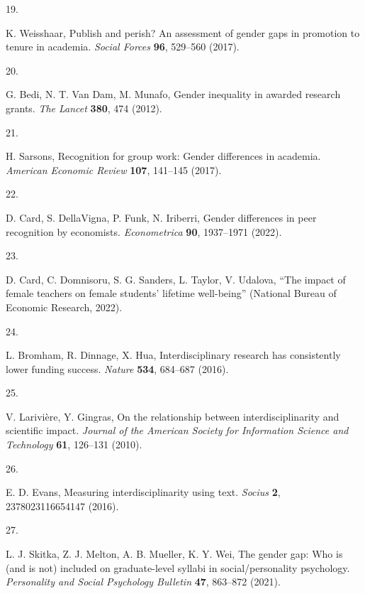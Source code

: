 \documentclass[
  12pt,
]{article}
\newlength{\cslhangindent}
\newlength{\csllabelwidth}
\newenvironment{CSLReferences}[2] %
 {\begin{list}{}{%
  \setlength{\itemindent}{0pt}
  \setlength{\leftmargin}{0pt}
  \setlength{\parsep}{0pt}
  \ifodd #1
   \setlength{\leftmargin}{\cslhangindent}
   \setlength{\itemindent}{-1\cslhangindent}
  \fi
  \setlength{\itemsep}{#2\baselineskip}}}
 {\end{list}}
\newcommand{\CSLLeftMargin}[1]{\parbox[t]{\csllabelwidth}{\strut#1\strut}}
\newcommand{\CSLRightInline}[1]{\parbox[t]{\linewidth - \csllabelwidth}{\strut#1\strut}}
\begin{document}
\begin{CSLReferences}{0}{1}
\CSLLeftMargin{19. }%
\CSLRightInline{K. Weisshaar, Publish and perish? An assessment of gender gaps in promotion to tenure in academia. \emph{Social Forces} \textbf{96}, 529--560 (2017).}

\CSLLeftMargin{20. }%
\CSLRightInline{G. Bedi, N. T. Van Dam, M. Munafo, Gender inequality in awarded research grants. \emph{The Lancet} \textbf{380}, 474 (2012).}

\CSLLeftMargin{21. }%
\CSLRightInline{H. Sarsons, Recognition for group work: Gender differences in academia. \emph{American Economic Review} \textbf{107}, 141--145 (2017).}

\CSLLeftMargin{22. }%
\CSLRightInline{D. Card, S. DellaVigna, P. Funk, N. Iriberri, Gender differences in peer recognition by economists. \emph{Econometrica} \textbf{90}, 1937--1971 (2022).}

\CSLLeftMargin{23. }%
\CSLRightInline{D. Card, C. Domnisoru, S. G. Sanders, L. Taylor, V. Udalova, {``The impact of female teachers on female students' lifetime well-being''} (National Bureau of Economic Research, 2022).}

\CSLLeftMargin{24. }%
\CSLRightInline{L. Bromham, R. Dinnage, X. Hua, Interdisciplinary research has consistently lower funding success. \emph{Nature} \textbf{534}, 684--687 (2016).}

\CSLLeftMargin{25. }%
\CSLRightInline{V. Larivière, Y. Gingras, On the relationship between interdisciplinarity and scientific impact. \emph{Journal of the American Society for Information Science and Technology} \textbf{61}, 126--131 (2010).}

\CSLLeftMargin{26. }%
\CSLRightInline{E. D. Evans, Measuring interdisciplinarity using text. \emph{Socius} \textbf{2}, 2378023116654147 (2016).}

\CSLLeftMargin{27. }%
\CSLRightInline{L. J. Skitka, Z. J. Melton, A. B. Mueller, K. Y. Wei, The gender gap: Who is (and is not) included on graduate-level syllabi in social/personality psychology. \emph{Personality and Social Psychology Bulletin} \textbf{47}, 863--872 (2021).}


\end{CSLReferences}
\end{document}
